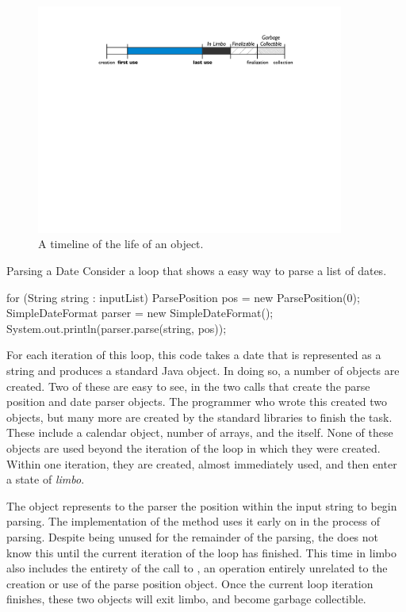 \begin{figure}
	\includegraphics[width=0.9\textwidth]{Figures/lifetime/object-lifecycle}
	\caption{A timeline of the life of an object.}
	\label{fig:typical-lifecycle}
\end{figure}

\begin{example}{Parsing a Date} Consider a loop that 
shows a easy way to parse a list of dates.
\begin{shortlisting}
	for (String string : inputList) {
		ParsePosition pos = new ParsePosition(0);
		SimpleDateFormat parser = new SimpleDateFormat();
		System.out.println(parser.parse(string, pos));
	}
\end{shortlisting}
For each iteration of this loop, this code takes a date that is represented as a
string and produces a standard Java  object. In doing so, a number of
objects are created. Two of these are easy to see, in the two  calls
that create the parse position and date parser objects. The programmer who wrote
this created two objects, but many more are created by the standard libraries to
finish the task. These include a calendar object, number of arrays, and the
 itself. None of these objects are used beyond the iteration of the
loop in which they were created. Within one iteration, they are created, almost
immediately used, and then enter a state of \emph{limbo}.


The  object represents to the parser the position within the
input string to begin parsing. The implementation of the  method
uses it early on in the process of parsing. Despite being unused for the
remainder of the parsing, the \jre does not know this until the current
iteration of the loop has finished. This time in limbo also includes the
entirety of the call to , an operation entirely
unrelated to the creation or use of the parse position object. Once the current
loop iteration finishes, these two objects will exit limbo, and become garbage
collectible.
\end{example}

